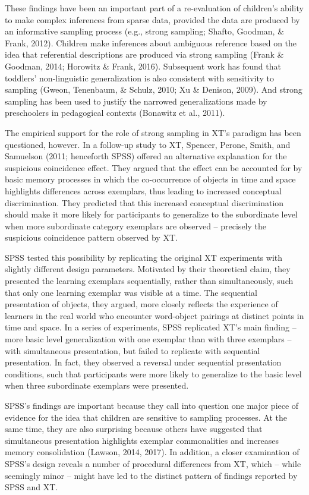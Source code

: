 \documentclass[english,floatsintext,man]{apa6}
\theoremstyle{definition}
\theoremstyle{definition}
\theoremstyle{definition}
\theoremstyle{remark}
\begin{document}
These findings have been an important part of a re-evaluation of
children's ability to make complex inferences from sparse data, provided
the data are produced by an informative sampling process (e.g., strong
sampling; Shafto, Goodman, \& Frank, 2012). Children make inferences
about ambiguous reference based on the idea that referential
descriptions are produced via strong sampling (Frank \& Goodman, 2014;
Horowitz \& Frank, 2016). Subsequent work has found that toddlers'
non-linguistic generalization is also consistent with sensitivity to
sampling (Gweon, Tenenbaum, \& Schulz, 2010; Xu \& Denison, 2009). And
strong sampling has been used to justify the narrowed generalizations
made by preschoolers in pedagogical contexts (Bonawitz et al., 2011).

The empirical support for the role of strong sampling in XT's paradigm
has been questioned, however. In a follow-up study to XT, Spencer,
Perone, Smith, and Samuelson (2011; henceforth SPSS) offered an
alternative explanation for the suspicious coincidence effect. They
argued that the effect can be accounted for by basic memory processes in
which the co-occurrence of objects in time and space highlights
differences across exemplars, thus leading to increased conceptual
discrimination. They predicted that this increased conceptual
discrimination should make it more likely for participants to generalize
to the subordinate level when more subordinate category exemplars are
observed -- precisely the suspicious coincidence pattern observed by XT.

SPSS tested this possibility by replicating the original XT experiments
with slightly different design parameters. Motivated by their
theoretical claim, they presented the learning exemplars sequentially,
rather than simultaneously, such that only one learning exemplar was
visible at a time. The sequential presentation of objects, they argued,
more closely reflects the experience of learners in the real world who
encounter word-object pairings at distinct points in time and space. In
a series of experiments, SPSS replicated XT's main finding -- more basic
level generalization with one exemplar than with three exemplars -- with
simultaneous presentation, but failed to replicate with sequential
presentation. In fact, they observed a reversal under sequential
presentation conditions, such that participants were more likely to
generalize to the basic level when three subordinate exemplars were
presented.

SPSS's findings are important because they call into question one major
piece of evidence for the idea that children are sensitive to sampling
processes. At the same time, they are also surprising because others
have suggested that simultaneous presentation highlights exemplar
commonalities and increases memory consolidation (Lawson, 2014, 2017).
In addition, a closer examination of SPSS's design reveals a number of
procedural differences from XT, which -- while seemingly minor -- might
have led to the distinct pattern of findings reported by SPSS and XT.
\end{document}
